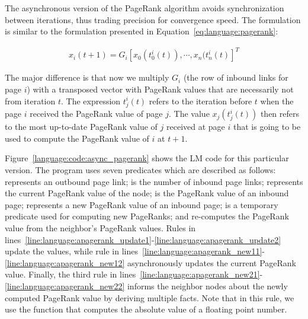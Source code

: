 The asynchronous version of the PageRank algorithm avoids synchronization
between iterations, thus trading precision for convergence speed.  The
formulation is similar to the formulation presented in
Equation~\ref{eq:language:pagerank}:

\begin{align}
x_{i}(t + 1) = G_{i} [x_{0}(t^{i}_{0}(t)), \cdots, x_{n}(t^{i}_{n}(t)]^{T}\label{eq:appendix:pagerank_async}
\end{align}

The major difference is that now we multiply $G_{i}$ (the row of inbound links
for page $i$) with a transposed vector with PageRank values that are necessarily
not from iteration $t$. The expression $t^{i}_{j}(t)$ refers to the iteration
before $t$ when the page $i$ received the PageRank value of page $j$. The value
$x_{j}(t^{i}_{j}(t))$ then refers to the most up-to-date PageRank value of $j$
received at page $i$ that is going to be used to compute the PageRank value of
$i$ at $t + 1$.

Figure~\ref{language:code:async_pagerank} shows the LM code for this particular
version. The program uses seven predicates which are described as follows:
 represents an outbound page link;  is the
number of inbound page links;  represents the current PageRank
value of the node;  is the PageRank value of an inbound
page;  represents a new PageRank value of an inbound
page;  is a temporary predicate used for computing new
PageRanks; and  re-computes the PageRank value from the neighbor's
PageRank values. Rules in
lines~\ref{line:language:apagerank_update1}-\ref{line:language:apagerank_update2}
update the  values, while rule in
lines~\ref{line:language:apagerank_new11}-\ref{line:language:apagerank_new12}
asynchronously updates the current PageRank value. Finally, the third rule in
lines~\ref{line:language:apagerank_new21}-\ref{line:language:apagerank_new22}
informs the neighbor nodes about the newly computed PageRank value by deriving
multiple  facts. Note that in this rule, we use the
function  that computes the absolute value of a floating point
number.

